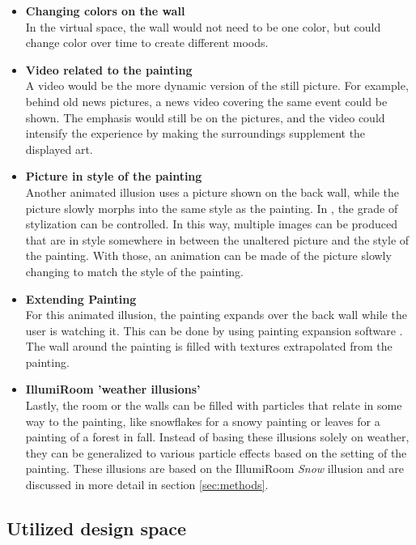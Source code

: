 \documentclass[a4paper]{article}
\begin{document}
\begin{itemize}

\item{\textbf{Changing colors on the wall}}
\\In the virtual space, the wall would not need to be one color, but could change color over time to create different moods.

\item{\textbf{Video related to the painting}}
\\A video would be the more dynamic version of the still picture. For example, behind old news pictures, a news video covering the same event could be shown. The emphasis would still be on the pictures, and the video could intensify the experience by making the surroundings supplement the displayed art.

\item{\textbf{Picture in style of the painting}}
\\Another animated illusion uses a picture shown on the back wall, while the picture slowly morphs into the same style as the painting. In \cite{gatys}, the grade of stylization can be controlled. In this way, multiple images can be produced that are in style somewhere in between the unaltered picture and the style of the painting. With those, an animation can be made of the picture slowly changing to match the style of the painting.

\item{\textbf{Extending Painting}}
\\For this animated illusion, the painting expands over the back wall while the user is watching it. This can be done by using painting expansion software \cite{inpainting}. The wall around the painting is filled with textures extrapolated from the painting.


\item{\textbf{IllumiRoom 'weather illusions'}}
\\Lastly, the room or the walls can be filled with particles that relate in some way to the painting, like snowflakes for a snowy painting or leaves for a painting of a forest in fall. Instead of basing these illusions solely on weather, they can be generalized to various particle effects based on the setting of the painting. These illusions are based on the IllumiRoom \emph{Snow} illusion \cite{illumiroom} and are discussed in more detail in section \ref{sec:methods}.
\end{itemize}

\subsection{Utilized design space} 
\end{document}
